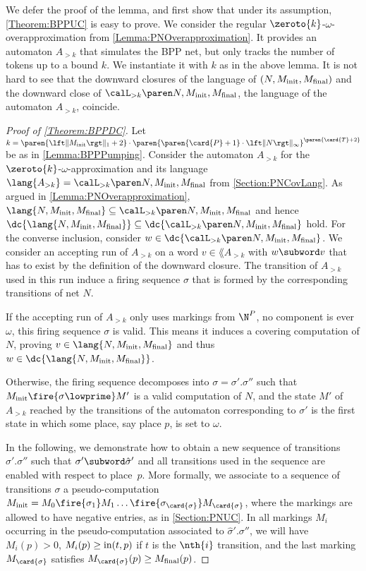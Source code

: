 \documentclass[../../diss.tex]{subfiles}
\begin{document}
We defer the proof of the lemma, and first show that under its assumption, \cref{Theorem:BPPUC} is easy to prove.
We consider the regular $\zeroto{k}$-$\omega$-overapproximation from \cref{Lemma:PNOverapproximation}.
It provides an automaton $A_{> k}$ that simulates the BPP net, but only tracks the number of tokens up to a bound $k$.
We instantiate it with $k$ as in the above lemma.
It is not hard to see that the downward closures of the language of $(N,M_{\text{init}},M_{\text{final}})$ and the downward close of $\langoak{k}{N,\Minit,\Mfinal}$, the language of the automaton $A_{> k}$, coincide.

\begin{proof}[Proof of \cref{Theorem:BPPDC}]
    Let $k = \paren{\normone{\Minit}+2} \cdot \paren{ \paren{\card{P}+1} \cdot \norminf{N}}^{ \paren{\card{T} + 2} }$ be as in \cref{Lemma:BPPPumping}.
    Consider the automaton $A_{> k}$ for the $\zeroto{k}$-$\omega$-approximation and its language $\lang{A_{>k}} = \langoak{k}{N,\Minit,\Mfinal}$ from \cref{Section:PNCovLang}.
    As argued in \cref{Lemma:PNOverapproximation}, $\lang{N,\Minit,\Mfinal} \subseteq \langoak{k}{N,\Minit,\Mfinal}$ and hence $\dc{\lang{N,\Minit,\Mfinal}} \subseteq \dc{\langoak{k}{N,\Minit,\Mfinal}}$ hold.
    For the converse inclusion, consider $w \in \dc{\langoak{k}{N,\Minit,\Mfinal}}$.
    We consider an accepting run of $A_{> k}$ on a word $v \in \lang{A_{> k}}$ with $w \subword v$ that has to exist by the definition of the downward closure.
    The transition of $A_{> k}$ used in this run induce a firing sequence $\sigma$ that is formed by the corresponding transitions of net $N$.

    If the accepting run of $A_{> k}$ only uses markings from $\N^P$, \ie no component is ever $\omega$, this firing sequence $\sigma$ is valid.
    This means it induces a covering computation of $N$, proving $v \in \lang{N,\Minit,\Mfinal}$ and thus $w \in \dc{\lang{N,\Minit,\Mfinal}}$.

    Otherwise, the firing sequence decomposes into $\sigma = \sigma'.\sigma''$ such that $\Minit \fire{\sigma\lowprime} M'$ is a valid computation of $N$, and the state $M'$ of $A_{> k}$ reached by the transitions of the automaton corresponding to $\sigma'$ is the first state in which some place, say place $p$, is set to $\omega$.

    In the following, we demonstrate how to obtain a new sequence of transitions $\hat{\sigma}'.\sigma''$ such that $\sigma' \subword \hat{\sigma}'$ and all transitions used in the sequence are enabled with respect to place~$p$.
    More formally, we associate to a sequence of transitions $\sigma$ a pseudo-computation $\Minit = M_0 \fire{\sigma_1} M_1 \ldots \fire{\sigma_{\card{\sigma}}} M_{\card{\sigma}}$, where the markings are allowed to have negative entries, as in \cref{Section:PNUC}.
    In all markings $M_i$ occurring in the pseudo-computation associated to $\hat{\sigma}'.\sigma''$, we will have $M_i(p) > 0$, $M_i(p) \geq \text{in}(t,p)$ if $t$ is the $\nth{i}$ transition, and the last marking $M_{\card{\sigma}}$ satisfies $M_{\card{\sigma}}(p) \geq \Mfinal(p)$.


\end{proof}
\end{document}
